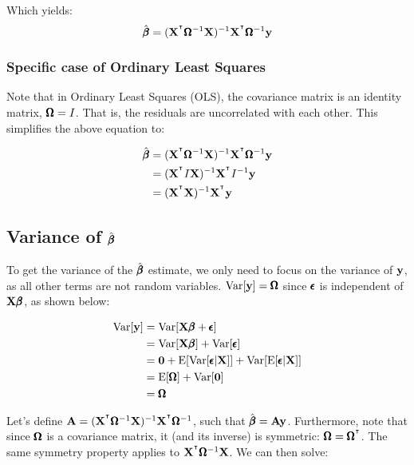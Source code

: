 \documentclass[12pt]{article}
\begin{document}
Which yields:
$$ \hat{\pmb{\beta}} = (\mathbf{X}^{^\intercal} \pmb{\Omega}^{-1} \mathbf{X})^{-1} \mathbf{X}^{^\intercal} \pmb{\Omega}^{-1} \mathbf{y} $$

\subsubsection{Specific case of Ordinary Least Squares}

Note that in Ordinary Least Squares (OLS), the covariance matrix is an identity matrix, $\pmb{\Omega} = I$. That is, the residuals are uncorrelated with each other. This simplifies the above equation to:

\begin{align*}
    \hat{\pmb{\beta}} &= (\mathbf{X}^{^\intercal} \pmb{\Omega}^{-1} \mathbf{X})^{-1} \mathbf{X}^{^\intercal} \pmb{\Omega}^{-1} \mathbf{y} \\
    &= (\mathbf{X}^{^\intercal} I \mathbf{X})^{-1} \mathbf{X}^{^\intercal} I^{-1} \mathbf{y} \\
    &= (\mathbf{X}^{^\intercal} \mathbf{X})^{-1} \mathbf{X}^{^\intercal} \mathbf{y}
\end{align*}



\subsection[Variance of beta-hat]{Variance of $\hat{\pmb{\beta}}$}

To get the variance of the $\hat{\pmb{\beta}}$ estimate, we only need to focus on the variance of $\mathbf{y}$, as all other terms are not random variables. $\mathrm{Var}[\mathbf{y}] = \pmb{\Omega}$ since $\pmb{\epsilon}$ is independent of $\mathbf{X} \pmb{\beta}$, as shown below:

\begin{align*}
    \mathrm{Var}[\mathbf{y}] &= \mathrm{Var}[\mathbf{X} \pmb{\beta} + \pmb{\epsilon}] \\
    &= \mathrm{Var}[\mathbf{X} \pmb{\beta}] + \mathrm{Var}[\pmb{\epsilon}] \\
    &= \mathbf{0} + \mathrm{E}[ \mathrm{Var}[\pmb{\epsilon} | \mathbf{X}] ] + \mathrm{Var}[ \mathrm{E}[\pmb{\epsilon} | \mathbf{X}]] \\
    &= \mathrm{E}[ \pmb{\Omega} ] + \mathrm{Var}[ \mathbf{0} ] \\ 
    &= \pmb{\Omega}
\end{align*}

Let's define $\mathbf{A} = (\mathbf{X}^{^\intercal} \pmb{\Omega}^{-1} \mathbf{X})^{-1} \mathbf{X}^{^\intercal} \pmb{\Omega}^{-1}$, such that $\hat{\pmb{\beta}} = \mathbf{A} \mathbf{y}$. Furthermore, note that since $\pmb{\Omega}$ is a covariance matrix, it (and its inverse) is symmetric: $\pmb{\Omega} = \pmb{\Omega}^{^\intercal}$. The same symmetry property applies to $\mathbf{X}^{^\intercal} \pmb{\Omega}^{-1} \mathbf{X}$. We can then solve:
\end{document}
